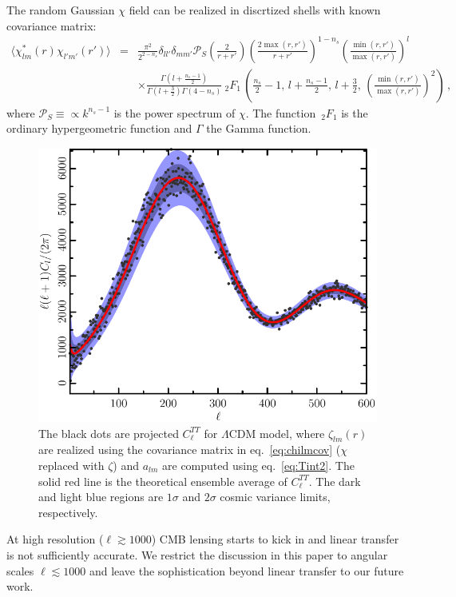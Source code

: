 The random Gaussian $\chi$ field can be realized in discrtized shells with known covariance matrix:
\begin{eqnarray}
  \langle \chi^*_{lm}(r) \chi_{l'm'}(r')\rangle &=& \frac{\pi^2}{2^{2-n_s}}  \delta_{ll'}\delta_{mm'} \mathcal{P}_S\left(\frac{2}{r+r'}\right) \left(\frac{2\max(r,r')}{r+r'}\right)^{1-n_s} \left(\frac{\min(r, r')}{\max(r,r')}\right)^l \label{eq:chilmcov} \\
 &&  \times \frac{\Gamma\left(l+\frac{n_s-1}{2}\right)}{\Gamma\left(l+\frac{3}{2}\right)\Gamma\left(4-n_s\right)} {\ _2F_1\,}\left( \frac{n_s}{2}-1,\, l+\frac{n_s-1}{2},\, l+ \frac{3}{2},\, \left(\frac{\min(r, r')}{\max(r,r')}\right)^2\right)     \nonumber \, , 
\end{eqnarray}
where $\mathcal{P}_S\equiv \propto k^{n_s-1} $ is the power spectrum of $\chi$. The function $\,_2F_1$ is the ordinary hypergeometric function and $\Gamma$ the Gamma function.


\begin{figure}
  \includegraphics[width=\textwidth]{ClTT_proj.pdf}
  \caption{The black dots are projected $C_\ell^{TT}$ for $\Lambda$CDM model, where $\zeta_{lm}(r)$ are realized using the covariance matrix in eq.~\eqref{eq:chilmcov} ($\chi$ replaced with $\zeta$) and $a_{lm}$ are computed using eq.~\eqref{eq:Tint2}. The solid red line is the theoretical ensemble average of $C_\ell^{TT}$. The dark and light blue regions are $1\sigma$ and $2\sigma$ cosmic variance limits, respectively.}
\end{figure} 


At high resolution ($\ell \gtrsim 1000$) CMB lensing starts to kick in and linear transfer is not sufficiently accurate. We restrict the discussion in this paper to angular scales $\ell \lesssim 1000$ and leave the sophistication beyond linear transfer to our future work.


